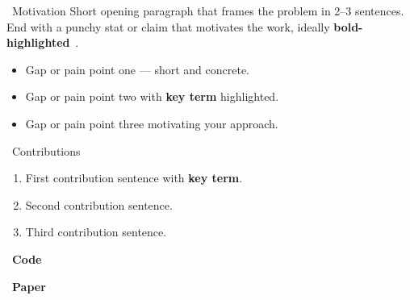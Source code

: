 \documentclass[final,t]{beamer}
\newlength{\colw}
\begin{document}
\begin{frame}[t]
\begin{columns}[t]
\begin{column}{\colw}
\begin{cardblock}{\faLightbulb~Motivation}
\justifying
Short opening paragraph that frames the problem in 2--3 sentences.
End with a punchy stat or claim that motivates the work, ideally
\textbf{bold-highlighted}~\cite{placeholderRef2025}.
\vspace{0.3em}
\begin{itemize}[leftmargin=*,itemsep=0.25em,label=\textcolor{accentTeal}{$\bullet$}]
  \item Gap or pain point one --- short and concrete.
  \item Gap or pain point two with \textbf{key term} highlighted.
  \item Gap or pain point three motivating your approach.
\end{itemize}
\end{cardblock}

\begin{cardblock}{\faBullseye~Contributions}
\begin{enumerate}[label=\textbf{\textcolor{accentTeal}{\arabic*.}},leftmargin=*,itemsep=0.25em]
  \item First contribution sentence with \textbf{key term}.
  \item Second contribution sentence.
  \item Third contribution sentence.
\end{enumerate}
\vspace{0.4em}
\begin{center}
\colorbox{accentLight}{\parbox{0.93\linewidth}{%
\centering
\begin{minipage}{0.48\linewidth}\centering
  \begin{minipage}[c]{6cm}\centering
    {\setlength{\fboxsep}{1mm}}%
  \end{minipage}\hspace{0.5cm}%
  \begin{minipage}[c]{4.5cm}\raggedright
    \mbox{\large\faGithub~\textbf{Code}}
  \end{minipage}
\end{minipage}\hfill
\begin{minipage}{0.48\linewidth}\centering
  \begin{minipage}[c]{6cm}\centering
    {\setlength{\fboxsep}{1mm}}%
  \end{minipage}\hspace{0.5cm}%
  \begin{minipage}[c]{4.5cm}\raggedright
    \mbox{\large\faFilePdf~\textbf{Paper}}
  \end{minipage}
\end{minipage}%
}}
\end{center}
\end{cardblock}


\end{column}
\end{columns}
\end{frame}
\end{document}
